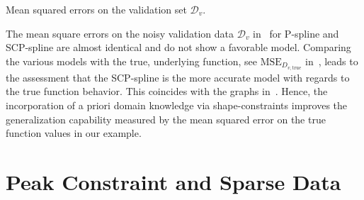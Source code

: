 \begin{table}[H]
	\begin{center}
	\end{center}
	\caption{Mean squared errors on the validation set $\mathcal{D}_v$.}
	\label{tab:test-func-peak-mses}
\end{table}
%
The mean square errors on the noisy validation data $\mathcal{D}_v$ in~ for P-spline and SCP-spline are almost identical and do not show a favorable model. Comparing the various models with the true, underlying function, see $\text{MSE}_{D_{v,\mathrm{true}}}$ in~, leads to the assessment that the SCP-spline is the more accurate model with regards to the true function behavior. This coincides with the graphs in~. Hence, the incorporation of a priori domain knowledge via shape-constraints improves the generalization capability measured by the mean squared error on the true function values in our example. 

\section{Peak Constraint and Sparse Data} \label{sec:peak-behav-sparse}

